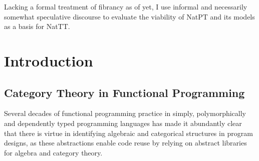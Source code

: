 \documentclass{lmcs} %
\theoremstyle{plain}\newtheorem{satz}[thm]{Satz} %
\theoremstyle{plain}
\theoremstyle{definition}
\begin{document}
Lacking a formal treatment of fibrancy as of yet, I use informal and necessarily somewhat speculative discourse to evaluate the viability of NatPT and its models as a basis for NatTT.

\section{Introduction}

\subsection{Category Theory in Functional Programming}
Several decades of functional programming practice in simply, polymorphically and dependently typed programming languages has made it abundantly clear that there is virtue in identifying algebraic and categorical structures in program designs, as these abstractions enable code reuse by relying on abstract libraries for algebra and category theory.
\end{document}

